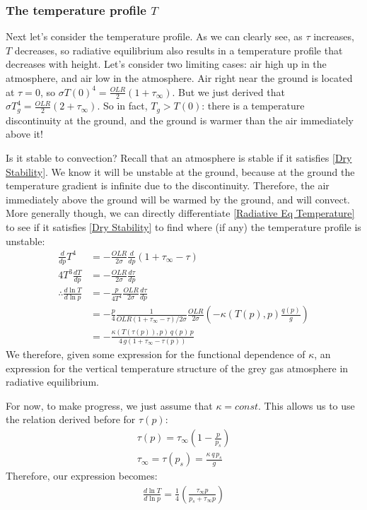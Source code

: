 \subsubsection{The temperature profile $T$}

Next let's consider the temperature profile. As we can clearly see, as $\tau$ increases, $T$ decreases, so radiative equilibrium also results in a temperature profile that decreases with height. Let's consider two limiting cases: air high up in the atmosphere, and air low in the atmosphere. Air right near the ground is located at $\tau=0$, so $\sigma T(0)^4=\frac{OLR}{2}(1+\tau_\infty)$. But we just derived that $\sigma T_g^4=\frac{OLR}{2}(2+\tau_\infty)$. So in fact, $T_g>T(0)$: there is a temperature discontinuity at the ground, and the ground is warmer than the air immediately above it! 

Is it stable to convection? Recall that an atmosphere is stable if it satisfies \ref{Dry Stability}. We know it will be unstable at the ground, because at the ground the temperature gradient is infinite due to the discontinuity. Therefore, the air immediately above the ground will be warmed by the ground, and will convect. More generally though, we can directly differentiate \ref{Radiative Eq Temperature} to see if it satisfies \ref{Dry Stability} to find where (if any) the temperature profile is unstable:
\begin{align*}
    \frac{d}{dp}T^4&=-\frac{OLR}{2\sigma}\frac{d}{dp}(1+\tau_\infty-\tau)
    \\
    4T^3\frac{dT}{dp}&=-\frac{OLR}{2\sigma}\frac{d\tau}{dp}
    \\
    \therefore
    \frac{d\ln T}{d\ln p}&=-\frac{p}{4T^4}\frac{OLR}{2\sigma}\frac{d\tau}{dp}
    \\
    &=-\frac{p}{4}\frac{1}{OLR(1+\tau_\infty-\tau)/2\sigma}\frac{OLR}{2\sigma}
    \left( -\kappa(T(p),p) \frac{q(p)}{g} \right)
    \\
    &=-\frac{\kappa(T(\tau(p)),p)\, q(p)\, p}{4\,g\left( 1+\tau_\infty-\tau(p) \right)}
\end{align*}
We therefore, given some expression for the functional dependence of $\kappa$, an expression for the vertical temperature structure of the grey gas atmosphere in radiative equilibrium.

For now, to make progress, we just assume that $\kappa = const$. This allows us to use the relation derived before for $\tau(p)$:
\begin{align*}
    \tau(p) = \tau_\infty \left( 1-\frac{p}{p_s} \right)
    \\
    \tau_\infty = \tau(p_s)=\frac{\kappa \,q \,p_s}{g}
\end{align*}
Therefore, our expression becomes:
\begin{align*}
    \frac{d\ln T}{d\ln p} = \frac{1}{4}\left( \frac{\tau_\infty p}{p_s +\tau_\infty p} \right)
\end{align*}

